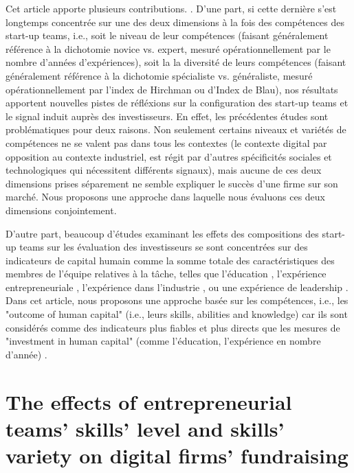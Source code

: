 \documentclass[12pt]{article}
\begin{document}
Cet article apporte plusieurs contributions. . D'une part, si cette dernière s'est longtemps concentrée sur une des deux dimensions à la fois des compétences des start-up teams, i.e., soit le niveau de leur compétences (faisant généralement référence à la dichotomie novice vs. expert, mesuré opérationnellement par le nombre d'années d'expériences), soit la la diversité de leurs compétences (faisant généralement référence à la dichotomie spécialiste vs. généraliste, mesuré opérationnellement par l'index de Hirchman ou d'Index de Blau), nos résultats apportent nouvelles pistes de réfléxions sur la configuration des start-up teams et le signal induit auprès des investisseurs. En effet, les précédentes études sont problématiques pour deux raisons. Non seulement certains niveaux et variétés de compétences ne se valent pas dans tous les contextes (le contexte digital par opposition au contexte industriel, est régit par d'autres spécificités sociales et technologiques qui nécessitent différents signaux), mais aucune de ces deux dimensions prises séparement ne semble expliquer le succès d'une firme sur son marché. Nous proposons une approche dans laquelle nous évaluons ces deux dimensions conjointement.

D'autre part, beaucoup d'études examinant les effets des compositions des start-up teams sur les évaluation des investisseurs se sont concentrées sur des indicateurs de capital humain comme la somme totale des caractéristiques des membres de l'équipe relatives à la tâche, telles que l'éducation \citep{franke2008venture}, l'expérience entrepreneuriale \citep{beckman2007early}, l'expérience dans l'industrie \citep{becker2015new}, ou une expérience de leadership \citep{hoenig2015quality}. Dans cet article, nous proposons une approche basée sur les compétences, i.e., les "outcome of human capital" (i.e., leurs skills, abilities and knowledge) car ils sont considérés comme des indicateurs plus fiables et plus directs que les mesures de "investment in human capital" (comme l'éducation, l'expérience en nombre d'année) \citep{unger2011human, marvel2016human}.

\section{The effects of entrepreneurial teams' skills' level and skills' variety on digital firms' fundraising}
\end{document}
